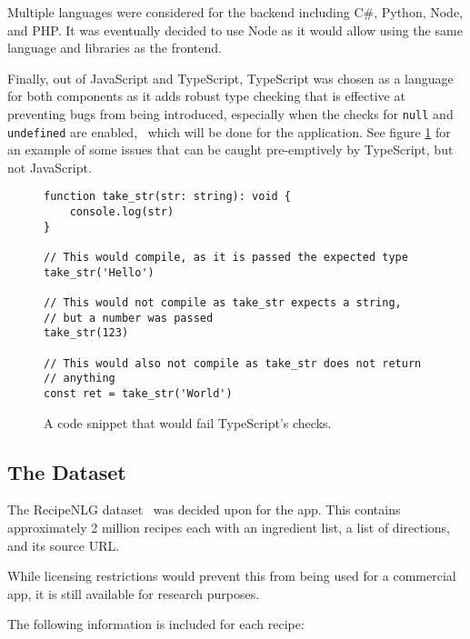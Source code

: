 Multiple languages were considered for the backend including C\#, Python, Node,
and PHP. It was eventually decided to use Node as it would allow using the same
language and libraries as the frontend.

Finally, out of JavaScript and TypeScript, TypeScript was chosen as a language
for both components as it adds robust type checking that is effective at preventing
bugs from being introduced, especially when the checks for \texttt{null} and
\texttt{undefined} are enabled,~\cite{gao_type_2017} which will be done for
the application. See figure \ref{fig:type_check} for an example of some issues
that can be caught pre-emptively by TypeScript, but not JavaScript.

\begin{figure}
    \caption{\label{fig:type_check}A code snippet that would fail TypeScript's checks.}
    \begin{verbatim}
function take_str(str: string): void {
    console.log(str)
}

// This would compile, as it is passed the expected type
take_str('Hello')

// This would not compile as take_str expects a string,
// but a number was passed
take_str(123)

// This would also not compile as take_str does not return
// anything
const ret = take_str('World')
    \end{verbatim}
\end{figure}

\subsection{The Dataset}\label{sec:data_pre_process}


The RecipeNLG dataset~\cite{bien_recipenlg_2020} was decided upon for the \chef{} app. This contains approximately 2 million recipes
each with an ingredient list, a list of directions, and its source URL.

While licensing restrictions would prevent this from being used for a commercial app, it is still available for
research purposes.

The following information is included for each recipe:

